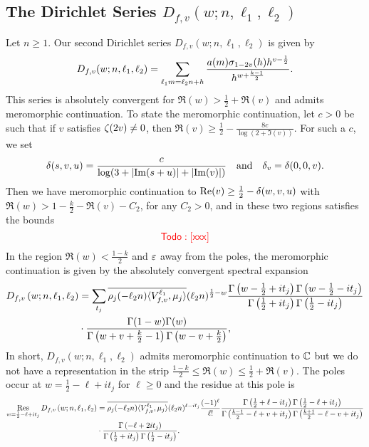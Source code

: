 \documentclass[12pt,reqno,oneside]{amsart}
\begin{document}
  \subsection*{The Dirichlet Series \texorpdfstring{$D_{f,v}(w;n,\ell_{1},\ell_{2})$}{}}
    Let $n \ge 1$. Our second Dirichlet series $D_{f,v}(w;n,\ell_{1},\ell_{2})$ is given by
    \[
      D_{f,v}(w;n,\ell_{1},\ell_{2}) = \sum_{\ell_{1}m = \ell_{2}n+h}\frac{a(m)\sigma_{1-2v}(h)h^{v-\frac{1}{2}}}{h^{w+\frac{k-1}{2}}}.
    \]
    This series is absolutely convergent for $\Re(w) > \frac{1}{2}+\Re(v)$ and admits meromorphic continuation. To state the meromorphic continuation, let $c > 0$ be such that if $v$ satisfies $\zeta(2v) \neq 0$, then $\Re(v)\ge \frac{1}{2}-\frac{8c}{\log(2+\Im(v))}$. For such a $c$, we set
    \[
      \delta(s,v,u) = \frac{c}{\log(3+|\mathrm{Im}(s+u)|+|\mathrm{Im}(v)|)} \quad \text{and} \quad \delta_{v} = \delta(0,0,v).
    \]
    Then we have meromorphic continuation to $\mathrm{Re}(v) \ge \frac{1}{2}-\delta(w,v,u)$ with $\Re(w) > 1-\frac{k}{2}-\Re(v)-C_{2}$, for any $C_{2} > 0$, and in these two regions satisfies the bounds
    \[
      \textcolor{red}{\sf Todo: [xxx]}
    \]
    In the region $\Re(w) < \frac{1-k}{2}$ and $\varepsilon$ away from the poles, the meromorphic continuation is given by the absolutely convergent spectral expansion
    \begin{align*}
      D_{f,v}\left(w;n,\ell_{1},\ell_{2}\right) &= \sum_{t_{j}}\overline{\rho_{j}(-\ell_{2}n)\langle V_{f,v}^{\ell_{1}},\mu_{j}\rangle}(\ell_{2}n)^{\frac{1}{2}-w}\frac{\Gamma\left(w-\frac{1}{2}+it_{j}\right)\Gamma\left(w-\frac{1}{2}-it_{j}\right)}{\Gamma\left(\frac{1}{2}+it_{j}\right)\Gamma\left(\frac{1}{2}-it_{j}\right)} \\
      &\cdot \frac{\Gamma(1-w)\Gamma(w)}{\Gamma\left(w+v+\frac{k}{2}-1\right)\Gamma\left(w-v+\frac{k}{2}\right)},
    \end{align*}
    In short, $D_{f,v}\left(w;n,\ell_{1},\ell_{2}\right)$ admits meromorphic continuation to $\mathbb{C}$ but we do not have a representation in the strip $\frac{1-k}{2} \le \Re(w) \le \frac{1}{2}+\Re(v)$. The poles occur at $w = \frac{1}{2}-\ell+it_{j}$ for $\ell \ge 0$ and the residue at this pole is
    \begin{align*}
      \operatorname*{\mathrm{Res}}_{w = \frac{1}{2}-\ell+it_{j}}D_{f,v}\left(w;n,\ell_{1},\ell_{2}\right) &= \overline{\rho_{j}(-\ell_{2}n)\langle V_{f,v}^{\ell_{1}},\mu_{j}\rangle}(\ell_{2}n)^{\ell-it_{j}}\frac{(-1)^{\ell}}{\ell!}\frac{\Gamma\left(\frac{1}{2}+\ell-it_{j}\right)\Gamma\left(\frac{1}{2}-\ell+it_{j}\right)}{\Gamma\left(\frac{k-1}{2}-\ell+v+it_{j}\right)\Gamma\left(\frac{k+1}{2}-\ell-v+it_{j}\right)} \\
      &\cdot \frac{\Gamma\left(-\ell+2it_{j}\right)}{\Gamma\left(\frac{1}{2}+it_{j}\right)\Gamma\left(\frac{1}{2}-it_{j}\right)}.
    \end{align*}
\end{document}
